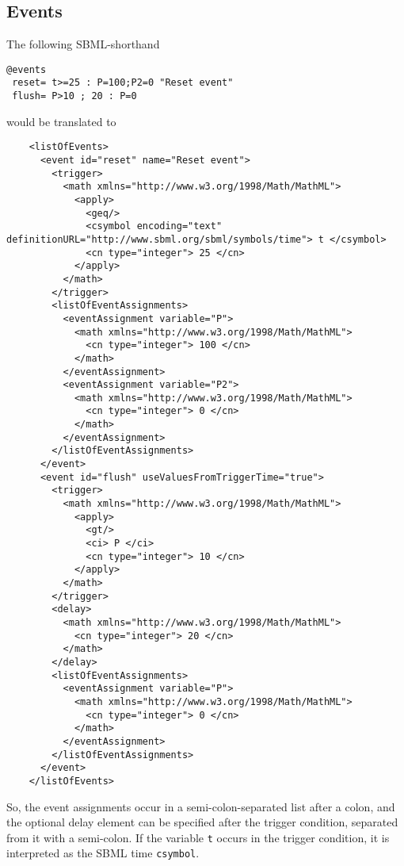 \documentclass[11pt,a4paper]{article}
\begin{document}
\subsection{Events}

The following SBML-shorthand
\begin{verbatim}
@events
 reset= t>=25 : P=100;P2=0 "Reset event"
 flush= P>10 ; 20 : P=0
\end{verbatim}
would be translated to

{\scriptsize
\begin{verbatim}
    <listOfEvents>
      <event id="reset" name="Reset event">
        <trigger>
          <math xmlns="http://www.w3.org/1998/Math/MathML">
            <apply>
              <geq/>
              <csymbol encoding="text" definitionURL="http://www.sbml.org/sbml/symbols/time"> t </csymbol>
              <cn type="integer"> 25 </cn>
            </apply>
          </math>
        </trigger>
        <listOfEventAssignments>
          <eventAssignment variable="P">
            <math xmlns="http://www.w3.org/1998/Math/MathML">
              <cn type="integer"> 100 </cn>
            </math>
          </eventAssignment>
          <eventAssignment variable="P2">
            <math xmlns="http://www.w3.org/1998/Math/MathML">
              <cn type="integer"> 0 </cn>
            </math>
          </eventAssignment>
        </listOfEventAssignments>
      </event>
      <event id="flush" useValuesFromTriggerTime="true">
        <trigger>
          <math xmlns="http://www.w3.org/1998/Math/MathML">
            <apply>
              <gt/>
              <ci> P </ci>
              <cn type="integer"> 10 </cn>
            </apply>
          </math>
        </trigger>
        <delay>
          <math xmlns="http://www.w3.org/1998/Math/MathML">
            <cn type="integer"> 20 </cn>
          </math>
        </delay>
        <listOfEventAssignments>
          <eventAssignment variable="P">
            <math xmlns="http://www.w3.org/1998/Math/MathML">
              <cn type="integer"> 0 </cn>
            </math>
          </eventAssignment>
        </listOfEventAssignments>
      </event>
    </listOfEvents>
\end{verbatim}
}

\noindent So, the event assignments occur in a semi-colon-separated list after a
colon, and the optional delay element can be specified after the
trigger condition, separated from it with a semi-colon. If the variable
\verb$t$ occurs in the trigger condition, it is interpreted as the
SBML time \texttt{csymbol}.
\end{document}

